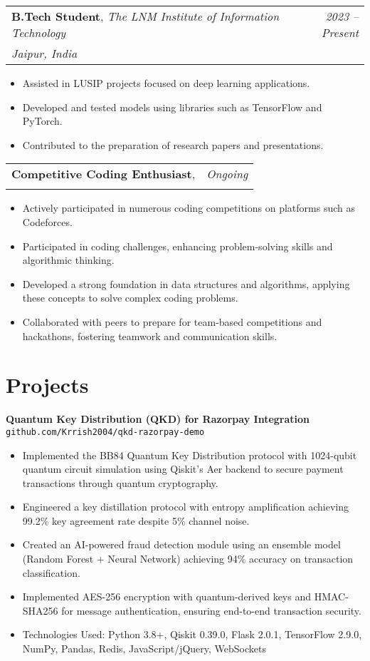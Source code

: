 \documentclass[11pt,a4paper]{article}
\makeatletter
\newcommand{\entrytitle}[1]{\textbf{#1}}
\newcommand{\entryposition}[1]{\textit{#1}}
\newcommand{\entrylocation}[1]{\textit{#1}}
\newcommand{\entrydate}[1]{\textit{#1}}
\newcommand{\entryinfo}[4]{
    \begin{tabularx}{\textwidth}{@{} X r @{}}
        \entrytitle{#1}, \entryposition{#2} & \entrydate{#4} \\
        \entrylocation{#3} & \\
    \end{tabularx}
}
\makeatother
\begin{document}
\entryinfo{B.Tech Student}{The LNM Institute of Information Technology}{Jaipur, India}{2023 -- Present}
\begin{itemize}[leftmargin=*, nosep]
    \item Assisted in LUSIP projects focused on deep learning applications.
    \item Developed and tested models using libraries such as TensorFlow and PyTorch.
    \item Contributed to the preparation of research papers and presentations.
\end{itemize}

\entryinfo{Competitive Coding Enthusiast}{}{}{Ongoing}
\begin{itemize}[leftmargin=*, nosep]
    \item Actively participated in numerous coding competitions on platforms such as Codeforces.
    \item Participated in coding challenges, enhancing problem-solving skills and algorithmic thinking.
    \item Developed a strong foundation in data structures and algorithms, applying these concepts to solve complex coding problems.
    \item Collaborated with peers to prepare for team-based competitions and hackathons, fostering teamwork and communication skills.
\end{itemize}

\section{Projects}

\entrytitle{Quantum Key Distribution (QKD) for Razorpay Integration} \hfill \texttt{github.com/Krrish2004/qkd-razorpay-demo}
\begin{itemize}[leftmargin=*, nosep]
    \item Implemented the BB84 Quantum Key Distribution protocol with 1024-qubit quantum circuit simulation using Qiskit's Aer backend to secure payment transactions through quantum cryptography.
    \item Engineered a key distillation protocol with entropy amplification achieving 99.2\% key agreement rate despite 5\% channel noise.
    \item Created an AI-powered fraud detection module using an ensemble model (Random Forest + Neural Network) achieving 94\% accuracy on transaction classification.
    \item Implemented AES-256 encryption with quantum-derived keys and HMAC-SHA256 for message authentication, ensuring end-to-end transaction security.
    \item Technologies Used: Python 3.8+, Qiskit 0.39.0, Flask 2.0.1, TensorFlow 2.9.0, NumPy, Pandas, Redis, JavaScript/jQuery, WebSockets
\end{itemize}
\end{document}
